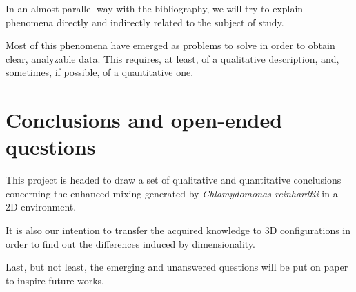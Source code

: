 In an almost parallel way with the bibliography, we will try to explain phenomena directly and indirectly related to the subject of study.

Most of this phenomena have emerged as problems to solve in order to obtain clear, analyzable data. This requires, at least, of a qualitative description, and, sometimes, if possible, of a quantitative one.

\section{Conclusions and open-ended questions}

This project is headed to draw a set of qualitative and quantitative conclusions concerning the enhanced mixing generated by \textit{Chlamydomonas reinhardtii} in a 2D environment.

It is also our intention to transfer the acquired knowledge to 3D configurations in order to find out the differences induced by dimensionality.

Last, but not least, the emerging and unanswered questions will be put on paper to inspire future works.
















